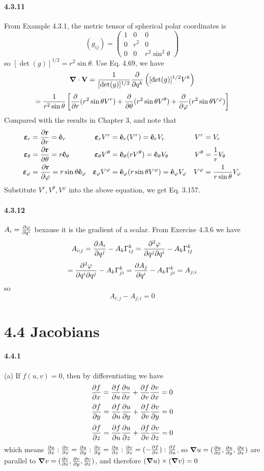 \documentclass[a4paper]{article}
\begin{document}
\paragraph{4.3.11}
From Example 4.3.1, the metric tensor of spherical polar coordinates is
\[
(g_{ij})=
\begin{pmatrix}
1&0&0\\
0&r^2&0\\
0&0&r^2\sin^2\theta
\end{pmatrix}
\]
so $[\det(g)]^{1/2}=r^2\sin\theta$. Use Eq. 4.69, we have 
\[
\del\cdot\V{V}=\frac{1}{[\det(g)]^{1/2}}\pdv{}{q^k}\left([\det(g)]^{1/2}V^k \right)
\]
\[
=\frac{1}{r^2\sin\theta}\left[\pdv{}{r}(r^2\sin\theta V^r)+\pdv{}{\theta}(r^2\sin\theta V^\theta)+\pdv{}{\varphi}(r^2\sin\theta V^\varphi) \right]
\]
Compared with the results in Chapter 3, and note that 
\begin{align*}
    \EE_r&=\pdv{\V{r}}{r}=\VE_r & \EE_r V^r&=\VE_r(V^r)=\VE_r V_r & V^r&=V_r\\
    \EE_\theta&=\pdv{\V{r}}{\theta}=r\VE_\theta & \EE_\theta V^\theta&=\VE_\theta(rV^\theta)=\VE_\theta V_\theta & V^\theta&=\frac{1}{r}V_\theta\\
    \EE_\varphi&=\pdv{\V{r}}{\varphi}=r\sin\theta\VE_\varphi & \EE_\varphi V^\varphi&=\VE_\varphi(r\sin\theta V^\varphi)=\VE_\varphi V_\varphi & V^\varphi&=\frac{1}{r\sin\theta}V_\varphi\\
\end{align*}
Substitute $V^r,V^\theta,V^\varphi$ into the above equation, we get Eq. 3.157.

\paragraph{4.3.12}
$A_i=\pdv{\varphi}{q^i}$ bexause it is the gradient of a scalar. From Exercise 4.3.6 we have 
\[
A_{i;j}=\pdv{A_i}{q^j}-A_k\Gamma^k_{ij}=\pdv{^2\varphi}{q^j\partial q^i}-A_k\Gamma^k_{ij}
\]
\[
=\pdv{^2\varphi}{q^i\partial q^j}-A_k\Gamma^k_{ji}=\pdv{A_j}{q^i}-A_k\Gamma^k_{ji}=A_{j;i}
\]
so
\[
A_{i;j}-A_{j;i}=0
\]

\section*{4.4 Jacobians}

\paragraph{4.4.1}
(a) If $f(u,v)=0$, then by differentiating we have
\[
\pdv{f}{x}=\pdv{f}{u}\pdv{u}{x}+\pdv{f}{v}\pdv{v}{x}=0
\]
\[
\pdv{f}{y}=\pdv{f}{u}\pdv{u}{y}+\pdv{f}{v}\pdv{v}{y}=0
\]
\[
\pdv{f}{z}=\pdv{f}{u}\pdv{u}{z}+\pdv{f}{v}\pdv{v}{z}=0
\]
which means $\pdv{u}{x}:\pdv{v}{x}=\pdv{u}{y}:\pdv{v}{y}=\pdv{u}{z}:\pdv{v}{z}=(-\pdv{f}{v}):\pdv{f}{u}$, so $\del u=(\pdv{u}{x},\pdv{u}{y},\pdv{u}{z})$ are parallel to $\del v=(\pdv{v}{x},\pdv{v}{y},\pdv{v}{z})$, and therefore $(\del u)\times(\del v)=0$
\medskip
\end{document}
